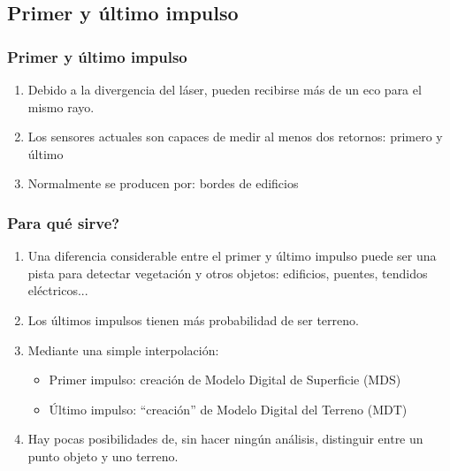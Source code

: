 \subsection{Primer y último impulso}
\begin{frame}[label=firstlast1]
    \frametitle{Primer y último impulso}
    \begin{enumerate}[<+->]
        \item Debido a la divergencia del láser, pueden recibirse \alert<1>{más de un eco} para el mismo rayo.
	\item Los sensores actuales son capaces de medir al menos dos retornos: \alert<2>{primero} y \alert<2>{último}
	\item Normalmente se producen por: \alert<3->{bordes} de edificios \uncover<4->{o \alert<4>{vegetación}}
    \end{enumerate}
    \begin{center}
    \end{center}
\end{frame}
\begin{frame}
    \frametitle{\textquestiondown Para qué sirve?}
    \begin{enumerate}[<+->]
     \item Una diferencia considerable entre el primer y último impulso puede ser una pista para detectar vegetación y otros objetos: edificios, puentes, tendidos eléctricos...
     \item Los últimos impulsos tienen más probabilidad de ser terreno.
     \item Mediante una simple interpolación:
     	\begin{itemize}
     	   \item Primer impulso: creación de Modelo Digital de Superficie (\alert<4>{MDS})
     	   \item \'Ultimo impulso: ``creación'' de Modelo Digital del Terreno (\alert<5>{MDT})
     	\end{itemize}
     \item Hay pocas posibilidades de, sin hacer ningún análisis, distinguir entre un punto \alert<6>{objeto} y uno \alert<6>{terreno}.
    \end{enumerate}
\end{frame}
